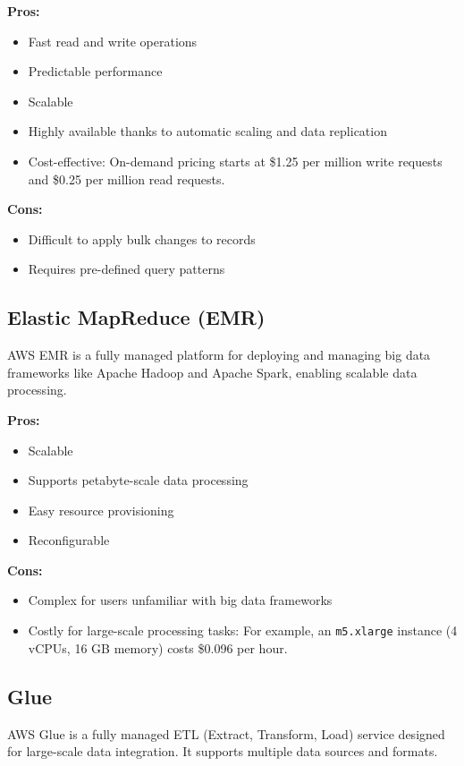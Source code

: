 \textbf{Pros:}
\begin{itemize}
    \item Fast read and write operations
    \item Predictable performance
    \item Scalable
    \item Highly available thanks to automatic scaling and data replication
    \item Cost-effective: On-demand pricing starts at \$1.25 per million write requests and \$0.25 per million read requests.
\end{itemize}

\textbf{Cons:}
\begin{itemize}
    \item Difficult to apply bulk changes to records
    \item Requires pre-defined query patterns
\end{itemize}

\subsection*{Elastic MapReduce (EMR)}
\label{aws:emr}
AWS EMR is a fully managed platform for deploying and managing big data frameworks like Apache Hadoop and Apache Spark, enabling scalable data processing.

\textbf{Pros:}
\begin{itemize}
    \item Scalable
    \item Supports petabyte-scale data processing
    \item Easy resource provisioning
    \item Reconfigurable
\end{itemize}

\textbf{Cons:}
\begin{itemize}
    \item Complex for users unfamiliar with big data frameworks
    \item Costly for large-scale processing tasks: For example, an \texttt{m5.xlarge} instance (4 vCPUs, 16 GB memory) costs \$0.096 per hour.
\end{itemize}

\subsection*{Glue}
\label{aws:glue}
AWS Glue is a fully managed ETL (Extract, Transform, Load) service designed for large-scale data integration. It supports multiple data sources and formats.

